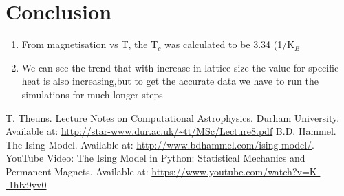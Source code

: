 \documentclass[11pt]{article}
\begin{document}
\section{Conclusion}
\begin{enumerate}
  \item From magnetisation vs T, the T$_c$ was calculated to be  3.34 (1/K$_B$
  \item We can see the trend that with increase in lattice size the value for specific heat is also increasing,but to get the accurate data we have to run the simulations for much longer steps
\end{enumerate}

\begin{thebibliography}{}
 T. Theuns. Lecture Notes on Computational Astrophysics. Durham University. Available at: \url{http://star-www.dur.ac.uk/~tt/MSc/Lecture8.pdf}
 B.D. Hammel. The Ising Model. Available at: \url{http://www.bdhammel.com/ising-model/}.
 YouTube Video: The Ising Model in Python: Statistical Mechanics and Permanent Magnets. Available at: \url{https://www.youtube.com/watch?v=K--1hlv9yv0}

\end{thebibliography}
\end{document}
